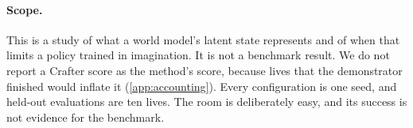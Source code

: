 \paragraph{Scope.}
This is a study of what a world model's latent state represents and of when that limits a policy trained in imagination. It is not a benchmark result. We do not report a Crafter score as the method's score, because lives that the demonstrator finished would inflate it (\cref{app:accounting}). Every configuration is one seed, and held-out evaluations are ten lives. The room is deliberately easy, and its success is not evidence for the benchmark.
